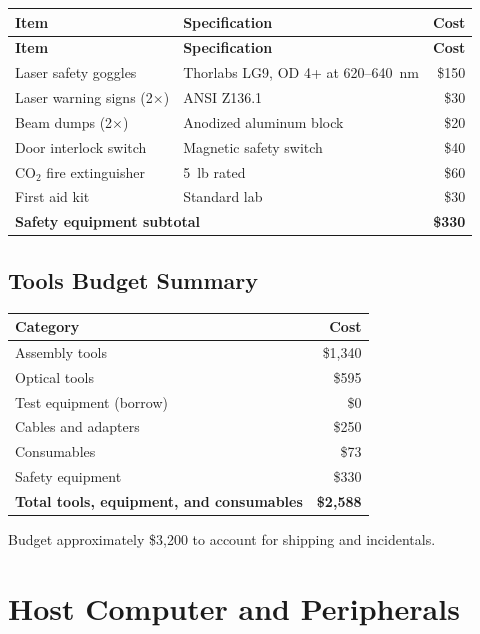 \documentclass[11pt,a4paper,openany]{book}
\begin{document}
\begin{center}
\begin{longtable}{p{5cm}lr}
\toprule
\textbf{Item} & \textbf{Specification} & \textbf{Cost} \\
\midrule
\endfirsthead
\toprule
\textbf{Item} & \textbf{Specification} & \textbf{Cost} \\
\midrule
\endhead
\bottomrule
\endfoot
\bottomrule
\endlastfoot
Laser safety goggles & Thorlabs LG9, OD 4+ at 620--640~nm & \$150 \\
Laser warning signs (2$\times$) & ANSI Z136.1 & \$30 \\
Beam dumps (2$\times$) & Anodized aluminum block & \$20 \\
Door interlock switch & Magnetic safety switch & \$40 \\
CO$_2$ fire extinguisher & 5~lb rated & \$60 \\
First aid kit & Standard lab & \$30 \\
\midrule
\multicolumn{2}{l}{\textbf{Safety equipment subtotal}} & \textbf{\$330} \\
\end{longtable}
\end{center}

\section{Tools Budget Summary}

\begin{center}
\begin{tabular}{lr}
\toprule
\textbf{Category} & \textbf{Cost} \\
\midrule
Assembly tools & \$1,340 \\
Optical tools & \$595 \\
Test equipment (borrow) & \$0 \\
Cables and adapters & \$250 \\
Consumables & \$73 \\
Safety equipment & \$330 \\
\midrule
\textbf{Total tools, equipment, and consumables} & \textbf{\$2,588} \\
\bottomrule
\end{tabular}
\end{center}

\noindent
Budget approximately \$3,200 to account for shipping and incidentals.


\chapter{Host Computer and Peripherals}\label{ch:hostpc}
\end{document}
